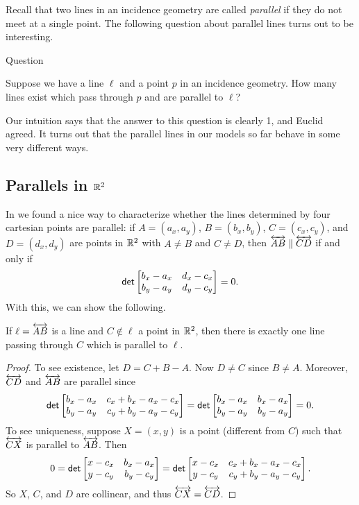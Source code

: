 Recall that two lines in an incidence geometry are called \emph{parallel} if they do not meet at a single point.
The following question about parallel lines turns out to be interesting.
\begin{titlebox}{Question}
\begin{center}
Suppose we have a line \(\ell\) and a point \(p\) in an incidence geometry.
How many lines exist which pass through \(p\) and are parallel to \(\ell\)?
\end{center}
\end{titlebox}
Our intuition says that the answer to this question is clearly 1, and Euclid agreed.
It turns out that the parallel lines in our models so far behave in some very different ways.


\subsection{Parallels in \(\mathbb{R}^2\)}

In  we found a nice way to characterize whether the lines determined by four cartesian points are parallel: if \(A = (a_x, a_y)\), \(B = (b_x, b_y)\), \(C = (c_x, c_y)\), and \(D = (d_x, d_y)\) are points in \(\mathbb{R}^2\) with \(A \neq B\) and \(C \neq D\), then \(\overleftrightarrow{AB} \parallel \overleftrightarrow{CD}\) if and only if \[ \mathsf{det} \begin{bmatrix} b_x - a_x & d_x - c_x \\ b_y - a_y & d_y - c_y \end{bmatrix} = 0. \]
With this, we can show the following.

\begin{prop}
If \(\ell = \overleftrightarrow{AB}\) is a line and \(C \notin \ell\) a point in \(\mathbb{R}^2\), then there is exactly one line passing through \(C\) which is parallel to \(\ell\).
\end{prop}

\begin{proof}
To see existence, let \(D = C + B - A\).
Now \(D \neq C\) since \(B \neq A\).
Moreover, \(\overleftrightarrow{CD}\) and \(\overleftrightarrow{AB}\) are parallel since \[ \mathsf{det} \begin{bmatrix} b_x - a_x & c_x + b_x - a_x - c_x \\ b_y - a_y & c_y + b_y - a_y - c_y \end{bmatrix} = \mathsf{det} \begin{bmatrix} b_x - a_x & b_x - a_x \\ b_y - a_y & b_y - a_y \end{bmatrix} = 0. \]
To see uniqueness, suppose \(X = (x, y)\) is a point (different from \(C\)) such that \(\overleftrightarrow{CX}\) is parallel to \(\overleftrightarrow{AB}\).
Then \[ 0 = \mathsf{det} \begin{bmatrix} x - c_x & b_x - a_x \\ y - c_y & b_y - c_y \end{bmatrix} = \mathsf{det} \begin{bmatrix} x - c_x & c_x + b_x - a_x - c_x \\ y - c_y & c_y + b_y - a_y - c_y \end{bmatrix}. \]
So \(X\), \(C\), and \(D\) are collinear, and thus \(\overleftrightarrow{CX} = \overleftrightarrow{CD}\).
\end{proof}

